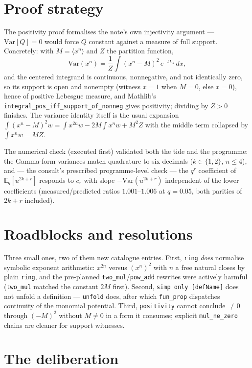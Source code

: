\documentclass[11pt]{article}
\begin{document}
\section{Proof strategy}

The positivity proof formalises the note's own injectivity argument
--- $\mathrm{Var}[Q] = 0$ would force $Q$ constant against a measure
of full support. Concretely: with $M = \langle x^n \rangle$ and $Z$
the partition function,
\[
\mathrm{Var}(x^n) = \frac{1}{Z}\int (x^n - M)^2\, e^{-t L_k}\,dx,
\]
and the centered integrand is continuous, nonnegative, and not
identically zero, so its support is open and nonempty
(witness $x = 1$ when $M = 0$, else $x = 0$), hence of positive
Lebesgue measure, and Mathlib's
\texttt{integral\_pos\_iff\_support\_of\_nonneg} gives positivity;
dividing by $Z > 0$ finishes. The variance identity itself is the
usual expansion $\int (x^n - M)^2 w = \int x^{2n} w - 2M \int x^n w +
M^2 Z$ with the middle term collapsed by $\int x^n w = MZ$.

The numerical check (executed first) validated both the tide and the
programme: the Gamma-form variances match quadrature to six decimals
($k \in \{1,2\}$, $n \le 4$), and --- the consult's prescribed
programme-level check --- the $q^r$ coefficient of
$\mathbb{E}_q[u^{2k+r}]$ responds to $c_r$ with slope
$-\mathrm{Var}(u^{2k+r})$ independent of the lower coefficients
(measured/predicted ratios $1.001$--$1.006$ at $q = 0.05$, both
parities of $2k+r$ included).

\section{Roadblocks and resolutions}

Three small ones, two of them new catalogue entries. First,
\texttt{ring} \emph{does} normalise symbolic exponent arithmetic:
$x^{2n}$ versus $(x^n)^2$ with $n$ a free natural closes by plain
\texttt{ring}, and the pre-planned \texttt{two\_mul}/\texttt{pow\_add}
rewrites were actively harmful (\texttt{two\_mul} matched the
constant $2M$ first). Second, \texttt{simp only [defName]} does not
unfold a definition --- \texttt{unfold} does, after which
\texttt{fun\_prop} dispatches continuity of the monomial potential.
Third, \texttt{positivity} cannot conclude $\ne 0$ through $(-M)^2$
without $M \ne 0$ in a form it consumes; explicit
\texttt{mul\_ne\_zero} chains are cleaner for support witnesses.

\section{The deliberation}
\end{document}
